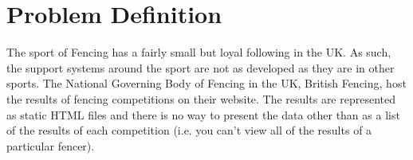 \chapter{Problem Definition}

The sport of Fencing has a fairly small but loyal following in the UK.
As such, the support systems around the sport are not as developed as
they are in other sports. The National Governing Body of Fencing in the
UK, British Fencing, host the results of fencing competitions on their
website. The results are represented as static HTML files and there is
no way to present the data other than as a list of the results of each
competition (i.e. you can't view all of the results of a particular fencer).